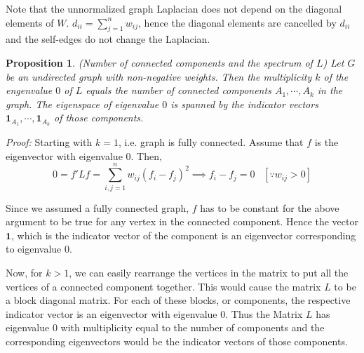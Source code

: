 \documentclass[10pt,a4paper, nocenter]{report}
\newtheorem{prop}{Proposition}
\begin{document}
    Note that the unnormalized graph Laplacian does not depend on the diagonal elements of $W$. $d_{ii} = \sum_{j=1}^{n}w_{ij}$, hence the diagonal elements are cancelled by $d_{ii}$ and the self-edges do not change the Laplacian. \\
    
    \begin{prop}
        (Number of connected components and the spectrum of $L$) Let $G$ be an undirected graph with non-negative weights. Then the multiplicity $k$ of the engenvalue $0$ of $L$ equals the number of connected components $A_{1},\cdots,A_{k}$ in the graph. The eigenspace of eigenvalue $0$ is spanned by the indicator vectors $\mathbf{1}_{A_{1}},\cdots,\mathbf{1}_{A_{k}}$ of those components.				
    \end{prop}
    \textit{Proof:}
    Starting with $k=1$, i.e. graph is fully connected. Assume that $f$ is the eigenvector with eigenvalue $0$. Then,
    $$ 0 = f'Lf = \sum_{i,j=1}^{n}w_{ij}(f_{i}-f_{j})^{2} \implies f_{i} - f_{j}=0 \hspace{10pt}[\because w_{ij} > 0]$$
    
    Since we assumed a fully connected graph, $f$ has to be constant for the above argument to be true for any vertex in the connected component. Hence the vector $\textbf{1}$, which is the indicator vector of the component is an eigenvector corresponding to eigenvalue $0$. 
    
    Now, for $k>1$, we can easily rearrange the vertices in the matrix to put all the vertices of a connected component together. This would cause the matrix $L$ to be a block diagonal matrix. For each of these blocks, or components, the respective indicator vector is an eigenvector with eigenvalue 0. Thus the Matrix $L$ has eigenvalue $0$ with multiplicity equal to the number of components and the corresponding eigenvectors would be the indicator vectors of those components. 
    $ $\\
\end{document}
